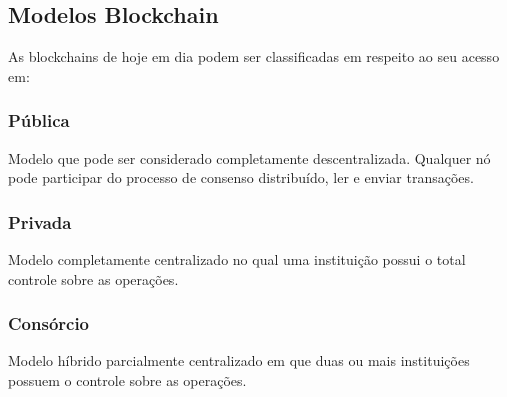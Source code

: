 \documentclass[12pt]{article}
\begin{document}
\subsection{Modelos Blockchain}

As blockchains de hoje em dia podem ser classificadas em respeito ao seu acesso em:

    \subsubsection{Pública}Modelo que pode ser considerado completamente descentralizada. Qualquer nó pode participar do processo de consenso distribuído, ler e enviar transações.
    \subsubsection{Privada}Modelo completamente centralizado no qual uma instituição possui o total controle sobre as operações.
    \subsubsection{Consórcio}Modelo híbrido parcialmente centralizado em que duas ou mais instituições possuem o controle sobre as operações.
    
\end{document}
